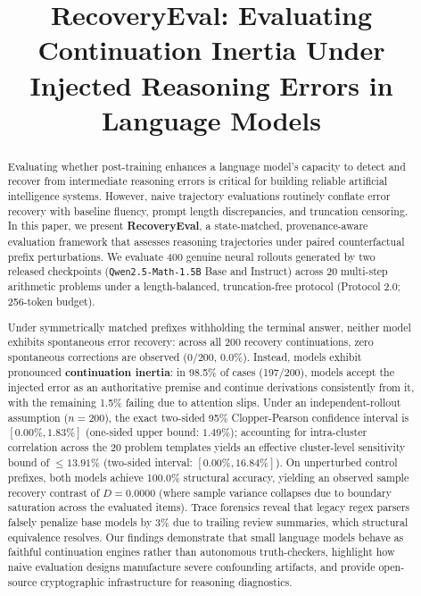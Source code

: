 \documentclass[10pt,conference]{IEEEtran}
\begin{document}
\title{RecoveryEval: Evaluating Continuation Inertia Under Injected Reasoning Errors in Language Models}

\author{
}

\maketitle

\begin{abstract}
Evaluating whether post-training enhances a language model's capacity to detect and recover from intermediate reasoning errors is critical for building reliable artificial intelligence systems. However, naive trajectory evaluations routinely conflate error recovery with baseline fluency, prompt length discrepancies, and truncation censoring. In this paper, we present \textbf{RecoveryEval}, a state-matched, provenance-aware evaluation framework that assesses reasoning trajectories under paired counterfactual prefix perturbations. We evaluate 400 genuine neural rollouts generated by two released checkpoints (\texttt{Qwen2.5-Math-1.5B} Base and Instruct) across 20 multi-step arithmetic problems under a length-balanced, truncation-free protocol (Protocol 2.0; 256-token budget). 

Under symmetrically matched prefixes withholding the terminal answer, neither model exhibits spontaneous error recovery: across all 200 recovery continuations, zero spontaneous corrections are observed ($0/200$, $0.0\%$). Instead, models exhibit pronounced \textbf{continuation inertia}: in 98.5\% of cases (197/200), models accept the injected error as an authoritative premise and continue derivations consistently from it, with the remaining 1.5\% failing due to attention slips. Under an independent-rollout assumption ($n=200$), the exact two-sided 95\% Clopper-Pearson confidence interval is $[0.00\%, 1.83\%]$ (one-sided upper bound: $1.49\%$); accounting for intra-cluster correlation across the 20 problem templates yields an effective cluster-level sensitivity bound of $\le 13.91\%$ (two-sided interval: $[0.00\%, 16.84\%]$). On unperturbed control prefixes, both models achieve 100.0\% structural accuracy, yielding an observed sample recovery contrast of $D = 0.0000$ (where sample variance collapses due to boundary saturation across the evaluated items). Trace forensics reveal that legacy regex parsers falsely penalize base models by 3\% due to trailing review summaries, which structural equivalence resolves. Our findings demonstrate that small language models behave as faithful continuation engines rather than autonomous truth-checkers, highlight how naive evaluation designs manufacture severe confounding artifacts, and provide open-source cryptographic infrastructure for reasoning diagnostics.
\end{abstract}
\end{document}
